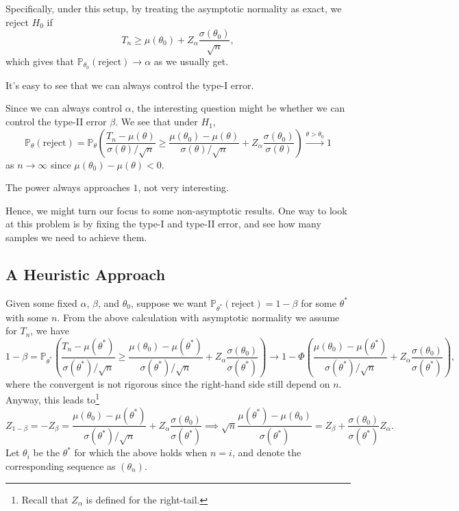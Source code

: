 Specifically, under this setup, by treating the asymptotic normality as exact, we reject \(H_0\) if
\[
	T_n \geq \mu (\theta _0) + Z_\alpha \frac{\sigma (\theta _0)}{\sqrt{n} },
\]
which gives that \(\mathbb{P} _{\theta _0}(\text{reject} ) \to \alpha \) as we usually get.

\begin{note}
	It's easy to see that we can always control the type-I error.
\end{note}

Since we can always control \(\alpha \), the interesting question might be whether we can control the type-II error \(\beta \). We see that under \(H_1\),
\[
	\mathbb{P} _{\theta }(\text{reject} )
	= \mathbb{P} _{\theta }\left( \frac{T_n - \mu (\theta )}{\sigma (\theta ) / \sqrt{n} } \geq \frac{\mu (\theta _0) - \mu (\theta )}{\sigma (\theta ) / \sqrt{n} } + Z_\alpha \frac{\sigma (\theta _0)}{\sigma (\theta )} \right)
	\overset{\theta > \theta _0}{\to } 1
\]
as \(n \to \infty \) since \(\mu (\theta _0) - \mu (\theta ) < 0\).

\begin{remark}
	The power always approaches \(1\), not very interesting.
\end{remark}

Hence, we might turn our focus to some non-asymptotic results. One way to look at this problem is by fixing the type-I and type-II error, and see how many samples we need to achieve them.

\subsection{A Heuristic Approach}
Given some fixed \(\alpha \), \(\beta \), and \(\theta _0\), suppose we want \(\mathbb{P} _{\theta ^{\ast} }(\text{reject} ) = 1 - \beta \) for some \(\theta ^{\ast} \) with some \(n\). From the above calculation with asymptotic normality we assume for \(T_n\), we have
\[
	1 - \beta
	= \mathbb{P} _{\theta ^{\ast} }\left( \frac{T_n - \mu (\theta ^{\ast} )}{\sigma (\theta ^{\ast} ) / \sqrt{n} } \geq \frac{\mu (\theta _0) - \mu (\theta ^{\ast} )}{\sigma (\theta ^{\ast} ) / \sqrt{n} } + Z_\alpha \frac{\sigma (\theta _0)}{\sigma (\theta ^{\ast} )} \right)
	\to 1 - \Phi \left( \frac{\mu (\theta _0) - \mu (\theta ^{\ast} )}{\sigma (\theta ^{\ast} ) / \sqrt{n} } + Z_\alpha \frac{\sigma (\theta _0)}{\sigma (\theta ^{\ast} )} \right) ,
\]
where the convergent is not rigorous since the right-hand side still depend on \(n\). Anyway, this leads to\footnote{Recall that \(Z_\alpha \) is defined for the right-tail.}
\[
	Z_{1 - \beta }
	= - Z_{\beta }
	= \frac{\mu (\theta _0) - \mu (\theta ^{\ast} )}{\sigma (\theta ^{\ast} ) / \sqrt{n} } + Z_\alpha \frac{\sigma (\theta _0)}{\sigma (\theta ^{\ast} )}
	\implies \sqrt{n} \frac{\mu (\theta ^{\ast} ) - \mu (\theta _0)}{\sigma (\theta ^{\ast} )}
	= Z_\beta + \frac{\sigma (\theta _0)}{\sigma (\theta ^{\ast} )} Z_\alpha .
\]
Let \(\theta _i\) be the \(\theta ^{\ast} \) for which the above holds when \(n = i\), and denote the corresponding sequence as \((\theta _n)\).

